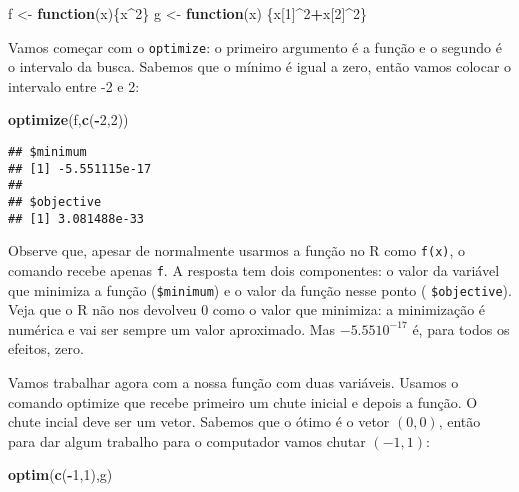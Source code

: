 \documentclass[
]{book}
\newenvironment{Shaded}{\begin{snugshade}}{\end{snugshade}}
\newcommand{\ControlFlowTok}[1]{\textcolor[rgb]{0.13,0.29,0.53}{\textbf{#1}}}
\newcommand{\DecValTok}[1]{\textcolor[rgb]{0.00,0.00,0.81}{#1}}
\newcommand{\KeywordTok}[1]{\textcolor[rgb]{0.13,0.29,0.53}{\textbf{#1}}}
\newcommand{\NormalTok}[1]{#1}
\newcommand{\OperatorTok}[1]{\textcolor[rgb]{0.81,0.36,0.00}{\textbf{#1}}}
\newcommand{\StringTok}[1]{\textcolor[rgb]{0.31,0.60,0.02}{#1}}
\begin{document}
\begin{Shaded}
\begin{Highlighting}[]
\NormalTok{f \textless{}{-}}\StringTok{ }\ControlFlowTok{function}\NormalTok{(x)\{x}\OperatorTok{\^{}}\DecValTok{2}\NormalTok{\}}
\NormalTok{g \textless{}{-}}\StringTok{ }\ControlFlowTok{function}\NormalTok{(x) \{x[}\DecValTok{1}\NormalTok{]}\OperatorTok{\^{}}\DecValTok{2}\OperatorTok{+}\NormalTok{x[}\DecValTok{2}\NormalTok{]}\OperatorTok{\^{}}\DecValTok{2}\NormalTok{\}}
\end{Highlighting}
\end{Shaded}

Vamos começar com o \texttt{optimize}: o primeiro argumento é a função e o segundo é o intervalo da busca. Sabemos que o mínimo é igual a zero, então vamos colocar o intervalo entre -2 e 2:

\begin{Shaded}
\begin{Highlighting}[]
\KeywordTok{optimize}\NormalTok{(f,}\KeywordTok{c}\NormalTok{(}\OperatorTok{{-}}\DecValTok{2}\NormalTok{,}\DecValTok{2}\NormalTok{))}
\end{Highlighting}
\end{Shaded}

\begin{verbatim}
## $minimum
## [1] -5.551115e-17
## 
## $objective
## [1] 3.081488e-33
\end{verbatim}

Observe que, apesar de normalmente usarmos a função no R como \texttt{f(x)}, o comando recebe apenas \texttt{f}. A resposta tem dois componentes: o valor da variável que minimiza a função (\texttt{\$minimum}) e o valor da função nesse ponto ( \texttt{\$objective}). Veja que o R não nos devolveu 0 como o valor que minimiza: a minimização é numérica e vai ser sempre um valor aproximado. Mas \(-5.55 10^{-17}\) é, para todos os efeitos, zero.

Vamos trabalhar agora com a nossa função com duas variáveis. Usamos o comando optimize que recebe primeiro um chute inicial e depois a função. O chute incial deve ser um vetor. Sabemos que o ótimo é o vetor \((0,0)\), então para dar algum trabalho para o computador vamos chutar \((-1,1)\):

\begin{Shaded}
\begin{Highlighting}[]
\KeywordTok{optim}\NormalTok{(}\KeywordTok{c}\NormalTok{(}\OperatorTok{{-}}\DecValTok{1}\NormalTok{,}\DecValTok{1}\NormalTok{),g)}
\end{Highlighting}
\end{Shaded}
\end{document}
